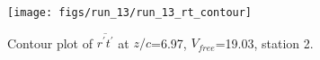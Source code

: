 \begin{figure}[H]
\centering
\texttt{[image: figs/run\_13/run\_13\_rt\_contour]}
\caption{Contour plot of $\overline{r^\prime t^\prime}$ at $z/c$=6.97, $V_{free}$=19.03, station 2.}
\label{fig:run_13_rt_contour}
\end{figure}


